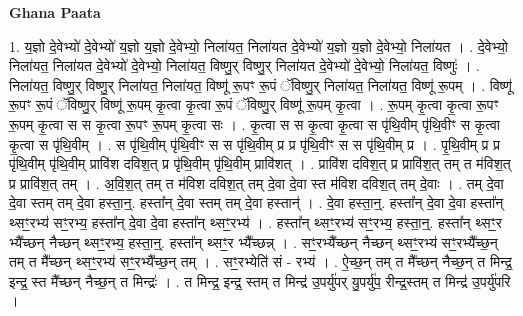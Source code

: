 \documentclass[17pt]{extarticle}
\begin{document}
\textbf{Ghana Paata } \newline

1. य॒ज्ञो दे॒वेभ्यो॑ दे॒वेभ्यो॑ य॒ज्ञो य॒ज्ञो दे॒वेभ्यो॒ निला॑यत॒ निला॑यत दे॒वेभ्यो॑ य॒ज्ञो य॒ज्ञो दे॒वेभ्यो॒ निला॑यत । . दे॒वेभ्यो॒ निला॑यत॒ निला॑यत दे॒वेभ्यो॑ दे॒वेभ्यो॒ निला॑यत॒ विष्णु॒र् विष्णु॒र् निला॑यत दे॒वेभ्यो॑ दे॒वेभ्यो॒ निला॑यत॒ विष्णुः॑ । . निला॑यत॒ विष्णु॒र् विष्णु॒र् निला॑यत॒ निला॑यत॒ विष्णू॑ रू॒पꣳ रू॒पं ॅविष्णु॒र् निला॑यत॒ निला॑यत॒ विष्णू॑ रू॒पम् । . विष्णू॑ रू॒पꣳ रू॒पं ॅविष्णु॒र् विष्णू॑ रू॒पम् कृ॒त्वा कृ॒त्वा रू॒पं ॅविष्णु॒र् विष्णू॑ रू॒पम् कृ॒त्वा । . रू॒पम् कृ॒त्वा कृ॒त्वा रू॒पꣳ रू॒पम् कृ॒त्वा स स कृ॒त्वा रू॒पꣳ रू॒पम् कृ॒त्वा सः । . कृ॒त्वा स स कृ॒त्वा कृ॒त्वा स पृ॑थि॒वीम् पृ॑थि॒वीꣳ स कृ॒त्वा कृ॒त्वा स पृ॑थि॒वीम् । . स पृ॑थि॒वीम् पृ॑थि॒वीꣳ स स पृ॑थि॒वीम् प्र प्र पृ॑थि॒वीꣳ स स पृ॑थि॒वीम् प्र । . पृ॒थि॒वीम् प्र प्र पृ॑थि॒वीम् पृ॑थि॒वीम् प्रावि॑श दविश॒त् प्र पृ॑थि॒वीम् पृ॑थि॒वीम् प्रावि॑शत् । . प्रावि॑श दविश॒त् प्र प्रावि॑श॒त् तम् त म॑विश॒त् प्र प्रावि॑श॒त् तम् । . अ॒वि॒श॒त् तम् त म॑विश दविश॒त् तम् दे॒वा दे॒वा स्त म॑विश दविश॒त् तम् दे॒वाः । . तम् दे॒वा दे॒वा स्तम् तम् दे॒वा हस्ता॒न्॒. हस्ता᳚न् दे॒वा स्तम् तम् दे॒वा हस्तान्॑ । . दे॒वा हस्ता॒न्॒. हस्ता᳚न् दे॒वा दे॒वा हस्ता᳚न् थ्सꣳ॒॒रभ्य॑ सꣳ॒॒रभ्य॒ हस्ता᳚न् दे॒वा दे॒वा हस्ता᳚न् थ्सꣳ॒॒रभ्य॑ । . हस्ता᳚न् थ्सꣳ॒॒रभ्य॑ सꣳ॒॒रभ्य॒ हस्ता॒न्॒. हस्ता᳚न् थ्सꣳ॒॒र भ्यै᳚च्छन् नैच्छन् थ्सꣳ॒॒रभ्य॒ हस्ता॒न्॒. हस्ता᳚न् थ्सꣳ॒॒र भ्यै᳚च्छन्न् । . सꣳ॒॒रभ्यै᳚च्छन् नैच्छन् थ्सꣳ॒॒रभ्य॑ सꣳ॒॒रभ्यै᳚च्छ॒न् तम् त मै᳚च्छन् थ्सꣳ॒॒रभ्य॑ सꣳ॒॒रभ्यै᳚च्छ॒न् तम् । . सꣳ॒॒रभ्येति॑ सं - रभ्य॑ । . ऐ॒च्छ॒न् तम् त मै᳚च्छन् नैच्छ॒न् त मिन्द्र॒ इन्द्र॒ स्त मै᳚च्छन् नैच्छ॒न् त मिन्द्रः॑ । . त मिन्द्र॒ इन्द्र॒ स्तम् त मिन्द्र॑ उ॒पर्यु॑पर् यु॒पर्यु॑प॒ रीन्द्र॒स्तम् त मिन्द्र॑ उ॒पर्यु॑परि । \newline
\end{document}
